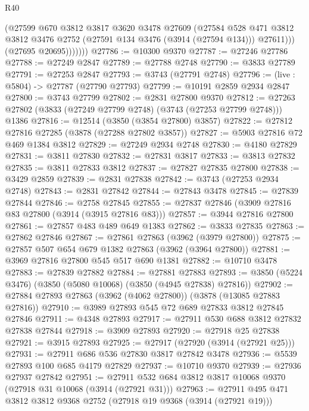 \begin{lexlean}{R40}
\begin{coremodule}
                  (@27599
                    @670
                    @3812
                    @3817
                    @3620
                    @3478
                    @27609
                    (@27584
                      @528
                      @471
                      @3812
                      @3812
                      @3476
                      @2752
                      (@27591 @134 @3476 (@3914 (@27594 @134)))
                      @27611)))
                (@27695 @20695)))))))
@27786 := @10300 @9370
@27787 := @27246 @27786
@27788 := @27249 @2847
@27789 := @27788 @2748
@27790 := @3833 @27789
@27791 := @27253 @2847
@27793 := @3743 (@27791 @2748)
@27796 := (live : @5804) -> @27787 (@27790 @27793)
@27799 := @10191 @2859 @2934 @2847
@27800 := @3743 @27799
@27802 := @2831 @27800 @9370
@27812 := @27263 @27802 (@3833 (@27249 @27799 @2748) (@3743 (@27253 @27799 @2748))) @1386
@27816 := @12514 (@3850 (@3854 @27800) @3857)
@27822 := @27812 @27816 @27285 (@3878 (@27288 @27802 @3857))
@27827 := @5903 @27816 @72 @469 @1384 @3812
@27829 := @27249 @2934 @2748
@27830 := @4180 @27829
@27831 := @3811 @27830
@27832 := @27831 @3817
@27833 := @3813 @27832
@27835 := @3811 @27833 @3812
@27837 := @27827 @27835 @27800
@27838 := @3429 @2859
@27839 := @2831 @27838
@27842 := @3743 (@27253 @2934 @2748)
@27843 := @2831 @27842
@27844 := @27843 @3478
@27845 := @27839 @27844
@27846 := @2758 @27845
@27855 := @27837 @27846 (@3909 @27816 @83 @27800 (@3914 (@3915 @27816 @83)))
@27857 := @3944 @27816 @27800
@27861 := @27857 @483 @489 @649 @1383
@27862 := @3833 @27835
@27863 := @27862 @27846
@27867 := @27861 @27863 (@3962 (@3979 @27800))
@27875 := @27857 @507 @654 @679 @1382 @27863 (@3962 (@3964 @27800))
@27881 := @3969 @27816 @27800 @545 @517 @690 @1381
@27882 := @10710 @3478
@27883 := @27839 @27882
@27884 := @27881 @27883
@27893 := @3850 (@5224 @3476) (@3850 (@5080 @10068) (@3850 (@4945 @27838) @27816))
@27902 := @27884 @27893 @27863 (@3962 (@4062 @27800)) (@3878 (@13085 @27883 @27816))
@27910 := @3989 @27893 @545 @72 @689 @27833 @3812 @27845 @27846
@27911 := @4348 @27893
@27917 := @27911 @530 @688 @3812 @27832 @27838 @27844
@27918 := @3909 @27893
@27920 := @27918 @25 @27838
@27921 := @3915 @27893
@27925 := @27917 (@27920 (@3914 (@27921 @25)))
@27931 := @27911 @686 @536 @27830 @3817 @27842 @3478
@27936 := @5539 @27893 @100 @685 @4179 @27829
@27937 := @10710 @9370
@27939 := @27936 @27937 @27842
@27951 := @27911 @532 @684 @3812 @3817 @10068 @9370 (@27918 @31 @10068 (@3914 (@27921 @31)))
@27963 := @27911 @495 @471 @3812 @3812 @9368 @2752 (@27918 @19 @9368 (@3914 (@27921 @19)))

\end{coremodule}
\end{lexlean}

